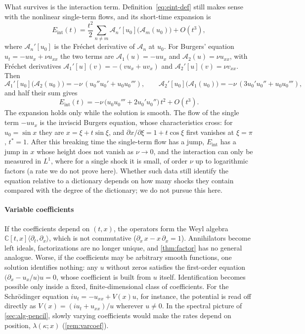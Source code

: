 \documentclass[11pt]{article}
\theoremstyle{plain}
\theoremstyle{definition}
\theoremstyle{remark}
\newcommand{\C}{\mathbb{C}}
\newcommand{\Eint}{E_{\mathrm{int}}}        %
\begin{document}
What survives is the interaction term. Definition~\eqref{eq:eint-def} still makes sense with the
nonlinear single-term flows, and its short-time expansion is
\begin{equation}\label{eq:jet}
  \Eint(t)=\frac{t^2}{2}\sum_{n\ne m}\mathcal A_n'[u_0]\big(\mathcal A_m(u_0)\big)+O(t^3),
\end{equation}
where $\mathcal A_n'[u_0]$ is the Fr\'echet derivative of $\mathcal A_n$ at $u_0$. For Burgers' equation
$u_t=-uu_x+\nu u_{xx}$ the two terms are $\mathcal A_1(u)=-uu_x$ and $\mathcal A_2(u)=\nu u_{xx}$, with Fr\'echet
derivatives $\mathcal A_1'[u](v)=-(vu_x+uv_x)$ and $\mathcal A_2'[u](v)=\nu v_{xx}$. Then
\[
  \mathcal A_1'[u_0]\big(\mathcal A_2(u_0)\big)=-\nu\,(u_0''u_0'+u_0u_0'''),\qquad
  \mathcal A_2'[u_0]\big(\mathcal A_1(u_0)\big)=-\nu\,(3u_0'u_0''+u_0u_0'''),
\]
and half their sum gives
\[
  \Eint(t)=-\nu\,\big(u_0u_0'''+2u_0'u_0''\big)\,t^2+O(t^3).
\]
The expansion holds only while the solution is smooth. The flow of the single term $-uu_x$ is the inviscid
Burgers equation, whose characteristics cross: for $u_0=\sin x$ they are $x=\xi+t\sin\xi$, and
$\partial x/\partial\xi=1+t\cos\xi$ first vanishes at $\xi=\pi$, $t^*=1$. After this breaking time the single-term flow
has a jump, $\Eint$ has a jump in $x$ whose height does not vanish as $\nu\to0$, and the interaction can only be measured in
$L^1$, where for a single shock it is small, of order $\nu$ up to logarithmic factors (a rate we do not prove here).
Whether such data still identify the equation relative to a dictionary depends on how many shocks they contain
compared with the degree of the dictionary; we do not pursue this here.

\paragraph{Variable coefficients}
If the coefficients depend on $(t,x)$, the operators form the Weyl algebra $\C[t,x]\langle\partial_t,\partial_x\rangle$, which
is not commutative ($\partial_x\,x-x\,\partial_x=1$). Annihilators become left ideals, factorizations are no longer unique,
and \cref{thm:factor} has no general analogue. Worse, if the coefficients may be arbitrary smooth functions, one solution
identifies nothing: any $u$ without zeros satisfies the first-order equation $\big(\partial_x-u_x/u\big)u=0$, whose
coefficient is built from $u$ itself. Identification becomes possible only inside a fixed, finite-dimensional class of
coefficients. For the Schr\"odinger equation $iu_t=-u_{xx}+V(x)u$, for instance, the potential is read off directly as
$V(x)=(iu_t+u_{xx})/u$ wherever $u\neq0$. In the spectral picture of \cref{sec:alg-pencil}, slowly varying coefficients
would make the rates depend on position, $\lambda(\kappa;x)$ (\cref{rem:varcoef}).
\end{document}
